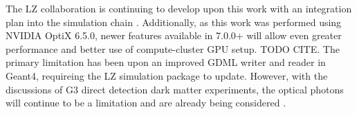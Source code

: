 \par
The LZ collaboration is continuing to develop upon this work with an integration plan into the simulation chain \cite{SEriksen_Opticks_CHEP_2021_ref}.
Additionally, as this work was performed using NVIDIA OptiX 6.5.0, newer features available in 7.0.0+ will allow even greater performance and better use of compute-cluster GPU setup.
TODO CITE.
The primary limitation has been upon an improved GDML writer and reader in Geant4, requireing the LZ simulation package to update. 
However, with the discussions of G3 direct detection dark matter experiments, the optical photons will continue to be a limitation and are already being considered \cite{DARWIN_GPU_simulations_2022}.




